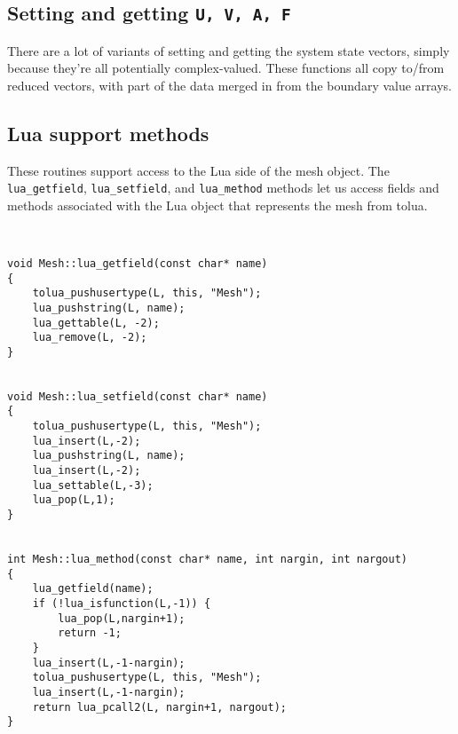\subsection{Setting and getting {\tt U, V, A, F}}

There are a lot of variants of setting and getting the system state
vectors, simply because they're all potentially complex-valued.
These functions all copy to/from reduced vectors, with part of the
data merged in from the boundary value arrays.

\subsection{Lua support methods}

These routines support access to the Lua side of the mesh object.
The {\tt lua\_getfield}, {\tt lua\_setfield}, and {\tt lua\_method}
methods let us access fields and methods associated with the Lua
object that represents the mesh from tolua.

\begin{verbatim}


void Mesh::lua_getfield(const char* name)
{
    tolua_pushusertype(L, this, "Mesh");
    lua_pushstring(L, name);
    lua_gettable(L, -2);
    lua_remove(L, -2);
}


void Mesh::lua_setfield(const char* name)
{
    tolua_pushusertype(L, this, "Mesh");
    lua_insert(L,-2);
    lua_pushstring(L, name);
    lua_insert(L,-2);
    lua_settable(L,-3);
    lua_pop(L,1);
}


int Mesh::lua_method(const char* name, int nargin, int nargout)
{
    lua_getfield(name);
    if (!lua_isfunction(L,-1)) {
        lua_pop(L,nargin+1);
        return -1;
    }
    lua_insert(L,-1-nargin);
    tolua_pushusertype(L, this, "Mesh");
    lua_insert(L,-1-nargin);
    return lua_pcall2(L, nargin+1, nargout);
}
\end{verbatim}
